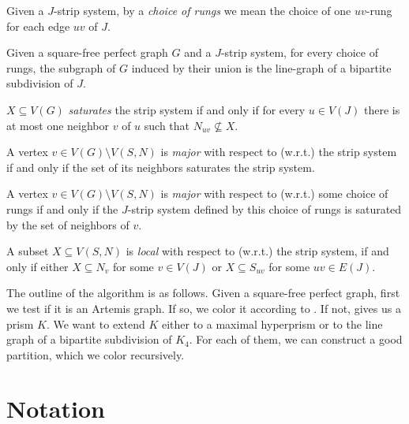 \begin{defnTwo}
  Given a $J$-strip system, by a \emph{choice of rungs} we mean the choice of one $uv$-rung for each edge $uv$ of $J$.
\end{defnTwo}

Given a square-free perfect graph $G$ and a $J$-strip system, for every choice of rungs, the subgraph of $G$ induced by their union is the line-graph of a bipartite subdivision of $J$.

\begin{defnTwo}
  $X \subseteq V(G)$ \emph{saturates} the strip system if and only if for every $u \in V(J)$ there is at most one neighbor $v$ of $u$ such that $N_{uv} \nsubseteq X$.
\end{defnTwo}

\begin{defnTwo}
  A vertex $v \in V(G) \setminus V(S, N)$  is \emph{major} with respect to (w.r.t.) the strip system if and only if the set of its neighbors saturates the strip system.
\end{defnTwo}

\begin{defnTwo}
  A vertex $v \in V(G) \setminus V(S, N)$  is \emph{major} with respect to (w.r.t.) some choice of rungs if and only if the $J$-strip system defined by this choice of rungs is saturated by the set of neighbors of $v$.
\end{defnTwo}

\begin{defnTwo}
  A subset $X \subseteq V(S, N)$ is \emph{local} with respect to (w.r.t.) the strip system, if and only if either $X \subseteq N_v$ for some $v \in V(J)$ or $X \subseteq S_{uv}$ for some $uv \in E(J)$.
\end{defnTwo}

The outline of the algorithm is as follows. Given a square-free perfect graph, first we test if it is an Artemis graph. If so, we color it according to . If not,  gives us a prism $K$. We want to extend $K$ either to a maximal hyperprism or to the line graph of a bipartite subdivision of $K_4$. For each of them, we can construct a good partition, which we color recursively.

\section{Notation}

